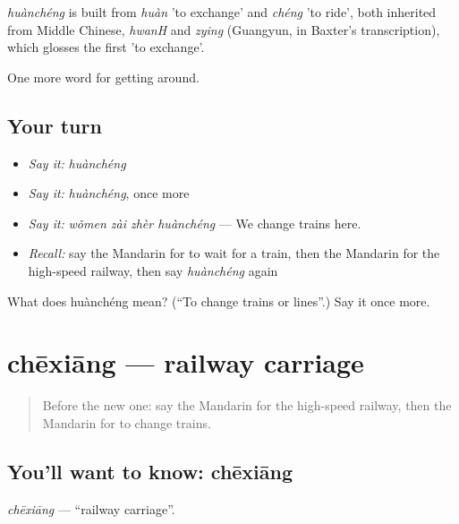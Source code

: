 \begin{cousinweb}
\emph{huànchéng} is built from \emph{huàn} 'to exchange' and \emph{chéng} 'to ride', both inherited from Middle Chinese, \emph{hwanH} and \emph{zying} (Guangyun, in Baxter's transcription), which glosses the first 'to exchange'.
\end{cousinweb}

\begin{grammarlens}[title={What you've built}]
One more word for getting around.
\end{grammarlens}

\subsection*{Your turn}
\begin{itemize}
\raggedright
  \item \emph{Say it:} \emph{huànchéng}
  \item \emph{Say it:} \emph{huànchéng}, once more
  \item \emph{Say it:} \emph{wǒmen zài zhèr huànchéng} — We change trains here.
  \item \emph{Recall:} say the Mandarin for to wait for a train, then the Mandarin for the high-speed railway, then say \emph{huànchéng} again
\end{itemize}

\begin{tcolorbox}[breakable,colback=teal!4,colframe=teal!35!black,title={Before you move on}]
What does huànchéng mean? (\textquotedblleft{}To change trains or lines\textquotedblright{}.) Say it once more.
\end{tcolorbox}
\section[chēxiāng]{chēxiāng — railway carriage}

\label{lesson:ZH-C402-chexiang}



\begin{quote}
Before the new one: say the Mandarin for the high-speed railway, then the Mandarin for to change trains.
\end{quote}

\subsection*{You'll want to know: chēxiāng}
\emph{chēxiāng} — \textquotedblleft{}railway carriage\textquotedblright{}.

